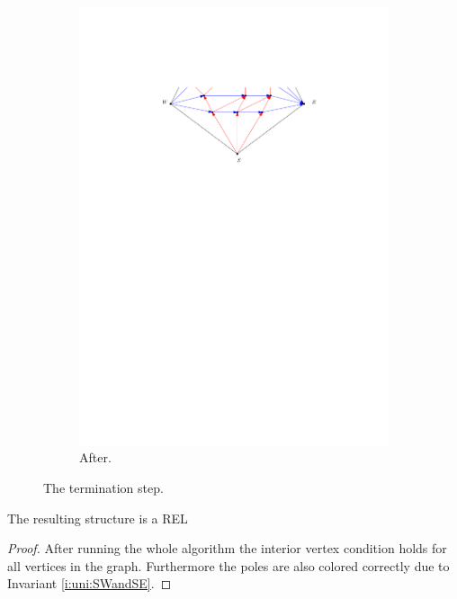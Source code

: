 \begin{figure}[h]
\begin{subfigure}[b]{0.45 \textwidth}
          \includegraphics[width =\textwidth]{unifiedAlgo/img/sweep/terminateAfter.pdf}
          \caption{After.}
      \end{subfigure}
      \caption{The termination step.}
      \label{fig:sweep:terminate}
    \end{figure}

    \begin{lemma}
      \label{lm:sweep:REL}
      The resulting structure is a REL
    \end{lemma}

    \begin{proof}
      After running the whole algorithm the interior vertex condition holds for all vertices in the graph. Furthermore the poles are also colored correctly due to Invariant \ref{i:uni:SWandSE}.
    \end{proof}


